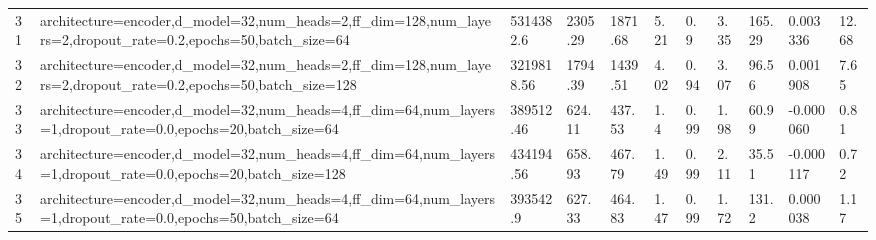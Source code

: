 \begin{longtable}{C{0.8cm} L{2cm} C{1.15cm} C{1.15cm} C{1.15cm} C{1.15cm} C{0.85cm} C{1.25cm} C{1.2cm} C{1.5cm} C{1.0cm}}
31 & architecture=encoder,\newline d\_model=32,\newline num\_heads=2,\newline ff\_dim=128,\newline num\_layers=2,\newline dropout\_rate=0.2,\newline epochs=50,\newline batch\_size=64 & 5314382.6 & 2305.29 & 1871.68 & 5.21 & 0.9 & 3.35 & 165.29 & 0.003336 & 12.68 \\
32 & architecture=encoder,\newline d\_model=32,\newline num\_heads=2,\newline ff\_dim=128,\newline num\_layers=2,\newline dropout\_rate=0.2,\newline epochs=50,\newline batch\_size=128 & 3219818.56 & 1794.39 & 1439.51 & 4.02 & 0.94 & 3.07 & 96.56 & 0.001908 & 7.65 \\
33 & architecture=encoder,\newline d\_model=32,\newline num\_heads=4,\newline ff\_dim=64,\newline num\_layers=1,\newline dropout\_rate=0.0,\newline epochs=20,\newline batch\_size=64 & 389512.46 & 624.11 & 437.53 & 1.4 & 0.99 & 1.98 & 60.99 & -0.000060 & 0.81 \\
34 & architecture=encoder,\newline d\_model=32,\newline num\_heads=4,\newline ff\_dim=64,\newline num\_layers=1,\newline dropout\_rate=0.0,\newline epochs=20,\newline batch\_size=128 & 434194.56 & 658.93 & 467.79 & 1.49 & 0.99 & 2.11 & 35.51 & -0.000117 & 0.72 \\
35 & architecture=encoder,\newline d\_model=32,\newline num\_heads=4,\newline ff\_dim=64,\newline num\_layers=1,\newline dropout\_rate=0.0,\newline epochs=50,\newline batch\_size=64 & 393542.9 & 627.33 & 464.83 & 1.47 & 0.99 & 1.72 & 131.2 & 0.000038 & 1.17 \\

\end{longtable}

